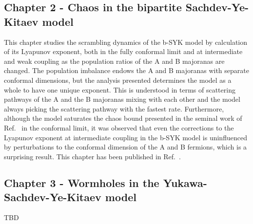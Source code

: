 \subsection{Chapter 2 - Chaos in the bipartite Sachdev-Ye-Kitaev model}
This chapter studies the scrambling dynamics of the b-SYK model by calculation of its Lyapunov exponent, both in the fully conformal limit and at intermediate and weak coupling as the population ratios of the A and B majoranas are changed. The population imbalance endows the A and B majoranas with separate conformal dimensions, but the analysis presented determines the model as a whole to have one unique exponent. This is understood in terms of scattering pathways of the A and the B majoranas mixing with each other and the model always picking the scattering pathway with the fastest rate. Furthermore, although the model saturates the chaos bound presented in the seminal work of Ref.~\cite{maldacena_bound_2016} in the conformal limit, it was observed that even the corrections to the Lyapunov exponent at intermediate coupling in the b-SYK model is uninfluenced by perturbations to the conformal dimension of the A and B fermions, which is a surprising result. This chapter has been published in Ref.~\cite{shankar2023lyapunov}.


\subsection{Chapter 3 - Wormholes in the Yukawa-Sachdev-Ye-Kitaev model}

TBD